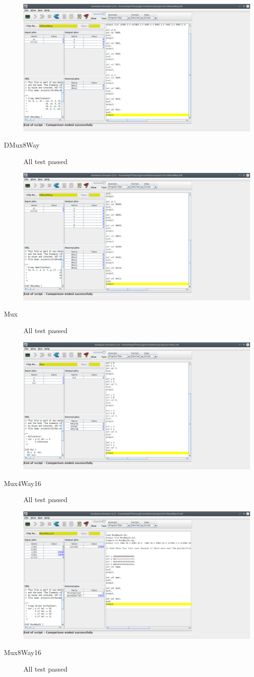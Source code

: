 \documentclass[titlepage]{article}
\begin{document}
\begin{description}
{    \includegraphics[width=.9\textwidth]{01/DMux4Way.png}
  }
  \item[DMux8Way]{
    All test passed

    \includegraphics[width=.9\textwidth]{01/DMux8Way.png}
  }
  \item[Mux]{
    All test passed

    \includegraphics[width=.9\textwidth]{01/Mux.png}
  }
  \item[Mux4Way16]{
    All test passed

    \includegraphics[width=.9\textwidth]{01/Mux4Way16.png}
  }
  \item[Mux8Way16]{
    All test passed

}
\end{description}
\end{document}
